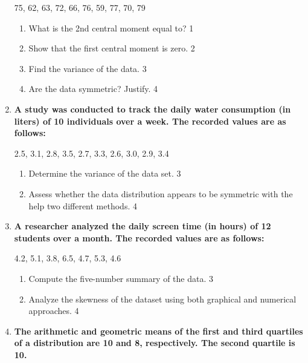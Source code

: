 \documentclass[a4paper,oneside]{book}
\begin{document}
\begin{enumerate}
	  \begin{center}
	  75, 62, 63, 72, 66, 76, 59, 77, 70, 79
	  \end{center}
    \begin{enumerate}
    \item
	What is the 2nd central moment equal to? \hfill 1
    \item
	Show that the first central moment is zero. \hfill 2
    \item  
	Find the variance of the data. \hfill 3
    \item
	Are the data symmetric? Justify. \hfill 4
  \end{enumerate}
  
  \item
\textbf{A study was conducted to track the daily water consumption (in liters) 
of 10 individuals over a week. The recorded values are as follows:}

\begin{center}
2.5, 3.1, 2.8, 3.5, 2.7, 3.3, 2.6, 3.0, 2.9, 3.4
\end{center}

\begin{enumerate}
\item
Determine the variance of the data set. \hfill 3
\item
Assess whether the data distribution appears to be symmetric with the help
two different methods. \hfill 4
\end{enumerate}

\item  
\textbf{A researcher analyzed the daily screen time (in hours) of 12 students over a month. The recorded values are as follows:}  

\begin{center}  
4.2, 5.1, 3.8, 6.5, 4.7, 5.3, 4.6  
\end{center}  

\begin{enumerate}  
\item  
Compute the five-number summary of the data. \hfill 3  
\item  
Analyze the skewness of the dataset using both graphical and numerical approaches. \hfill 4  
\end{enumerate}  

  
   \item
	  \textbf{The arithmetic and geometric means of the first and third 
	  quartiles of a distribution are 10 and 8, respectively. The 
	  second quartile is 10.} 
  

\end{enumerate}
\end{document}
